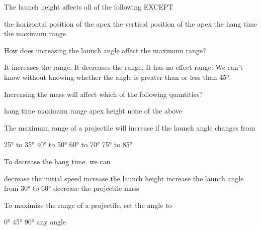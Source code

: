\documentclass[../main-physics-workbook.tex]{subfiles}
\begin{document}
\begin{questions}
\question
The launch height affects all of the following EXCEPT

\begin{randomizechoices}
    \correctchoice the horizontal position of the apex
    \choice the vertical position of the apex
    \choice the hang time
    \choice the maximum range
\end{randomizechoices}

\question
How does increasing the launch angle affect the maximum range?

\begin{randomizechoices}[keeplast]
    \choice It increases the range.
    \choice It decreases the range.
    \choice It has no effect range.
    \correctchoice We can't know without knowing whether the angle is greater than or less than \ang{45}.
\end{randomizechoices}

\question
Increasing the mass will affect which of the following quantities?

\begin{randomizechoices}[keeplast]
    \choice hang time
    \choice maximum range
    \choice apex height
    \correctchoice none of the above
\end{randomizechoices}

\question
The maximum range of a projectile will increase if the launch angle changes from 

\begin{randomizechoices}
    \correctchoice \ang{25} to \ang{35}
    \choice \ang{40} to \ang{50}
    \choice \ang{60} to \ang{70}
    \choice \ang{75} to \ang{85}
\end{randomizechoices}

\question
To decrease the hang time, we can

\begin{randomizechoices}
    \correctchoice decrease the initial speed
    \choice increase the launch height
    \choice increase the launch angle from \ang{30} to \ang{60}
    \choice decrease the projectile mass
\end{randomizechoices}

\question
To maximize the range of a projectile, set the angle to 

\begin{randomizechoices}
    \choice \ang{0}
    \correctchoice \ang{45}
    \choice \ang{90}
    \choice any angle
\end{randomizechoices}
\end{questions}
\end{document}
